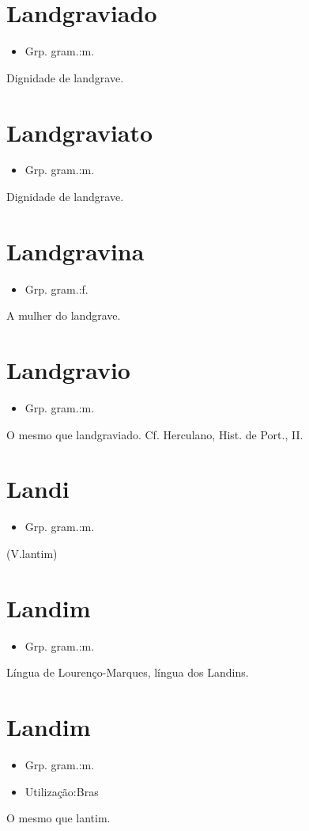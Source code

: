 \section{Landgraviado}
\begin{itemize}
\item {Grp. gram.:m.}
\end{itemize}
Dignidade de landgrave.
\section{Landgraviato}
\begin{itemize}
\item {Grp. gram.:m.}
\end{itemize}
Dignidade de landgrave.
\section{Landgravina}
\begin{itemize}
\item {Grp. gram.:f.}
\end{itemize}
A mulher do landgrave.
\section{Landgravio}
\begin{itemize}
\item {Grp. gram.:m.}
\end{itemize}
O mesmo que \textunderscore landgraviado\textunderscore . Cf. Herculano, \textunderscore Hist. de Port.\textunderscore , II.
\section{Landi}
\begin{itemize}
\item {Grp. gram.:m.}
\end{itemize}
(V.lantim)
\section{Landim}
\begin{itemize}
\item {Grp. gram.:m.}
\end{itemize}
Língua de Lourenço-Marques, língua dos Landins.
\section{Landim}
\begin{itemize}
\item {Grp. gram.:m.}
\end{itemize}
\begin{itemize}
\item {Utilização:Bras}
\end{itemize}
O mesmo que \textunderscore lantim\textunderscore .
